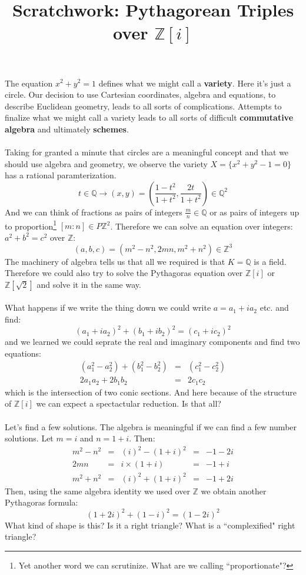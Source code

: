 \documentclass[12pt]{article}
\title{Scratchwork: Pythagorean Triples over $\mathbb{Z}[i]$}
\date{}
\begin{document}

\sffamily

\maketitle

\noindent The equation $x^2 + y^2 = 1$ defines what we might call a \textbf{variety}.  Here it's just a circle.  Our decision to use Cartesian coordinates, algebra and equations, to describe Euclidean geometry, leads to all sorts of complications.  Attempts to finalize what we might call a variety leads to all sorts of difficult \textbf{commutative algebra} and ultimately \textbf{schemes}.  \\ \\
Taking for granted a minute that circles are a meaningful concept and that we should use algebra and geometry, we observe the variety $X = \{ x^2 + y^2 - 1 = 0\}$ has a rational paramterization.
$$ t \in \mathbb{Q}  \longrightarrow (x,y) = \left( \frac{1-t^2}{1 + t^2}, \frac{2t}{1+t^2} \right) \in \mathbb{Q}^2 $$
And we can think of fractions as pairs of integers $\frac{m}{n} \in \mathbb{Q}$ or as pairs of integers up to proportion\footnote{Yet another word we can scrutinize.  What are we calling ``proportionate"? } $[m:n] \in P\mathbb{Z}^2$.  Therefore we can solve an equation over integers: $a^2 + b^2 = c^2$ over $\mathbb{Z}$:
$$ (a,b,c) = (m^2 - n^2, 2mn, m^2 + n^2) \in \mathbb{Z}^3$$ 
The machinery of algebra tells us that all we required is that $K = \mathbb{Q}$ is a field.  Therefore we could also try to solve the Pythagoras equation over $\mathbb{Z}[i]$ or $\mathbb{Z}[\sqrt{2}]$ and solve it in the same way. \\ \\
What happens if we write the thing down we could write $a = a_1 + i a_2$ etc. and find:
$$ (a_1 + i a_2)^2 + (b_1 + i b_2)^2 = (c_1 + i c_2)^2 $$
and we learned we could seprate the real and imaginary components and find two equations:
\begin{eqnarray*}
(a_1^2 - a_2^2) + (b_1^2 - b_2^2)  &=& (c_1^2 - c_2^2) \\
2a_1 a_2 + 2 b_1 b_2 &=& 2 c_1 c_2 
\end{eqnarray*}
which is the intersection of two conic sections.  And here because of the structure of $\mathbb{Z}[i]$ we can expect a spectactular reduction.  Is that all? \\ \\ 
Let's find a few solutions.  The algebra is meaningful if we can find a few number solutions.  Let $m = i$ and $n = 1+i$.  Then:
$$ \begin{array}{ccccl} m^2 - n^2 &=& (i)^2 - (1+i)^2 &=& -1 - 2i \\
2mn &=& i \times (1+i) &=& -1 + i \\
m^2 + n^2 &=& (i)^2 + (1+i)^2 &=& -1 + 2i \end{array}$$
Then, using the same algebra identity we used over $\mathbb{Z}$ we obtain another Pythagoras formula:
$$ (1 +2i)^2 + (1 - i)^2 = (1 - 2i)^2  $$
What kind of shape is this?  Is it a right triangle?  What is a ``complexified" right triangle?  
\end{document}
